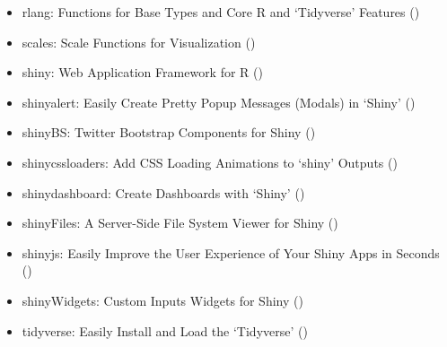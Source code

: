 \documentclass[]{book}
\theoremstyle{definition}
\theoremstyle{definition}
\theoremstyle{definition}
\theoremstyle{remark}
\begin{document}
\begin{itemize}
  (\citet{R-reshape2})
\item
  rlang: Functions for Base Types and Core R and `Tidyverse' Features
  (\citet{R-rlang})
\item
  scales: Scale Functions for Visualization (\citet{R-scales})
\item
  shiny: Web Application Framework for R (\citet{R-shiny})
\item
  shinyalert: Easily Create Pretty Popup Messages (Modals) in `Shiny'
  (\citet{R-shinyalert})
\item
  shinyBS: Twitter Bootstrap Components for Shiny (\citet{R-shinyBS})
\item
  shinycssloaders: Add CSS Loading Animations to `shiny' Outputs
  (\citet{R-shinycssloaders})
\item
  shinydashboard: Create Dashboards with `Shiny'
  (\citet{R-shinydashboard})
\item
  shinyFiles: A Server-Side File System Viewer for Shiny
  (\citet{R-shinyFiles})
\item
  shinyjs: Easily Improve the User Experience of Your Shiny Apps in
  Seconds (\citet{R-shinyjs})
\item
  shinyWidgets: Custom Inputs Widgets for Shiny (\citet{R-shinyWidgets})
\item
  tidyverse: Easily Install and Load the `Tidyverse'
  (\citet{R-tidyverse})
\end{itemize}


\end{document}
